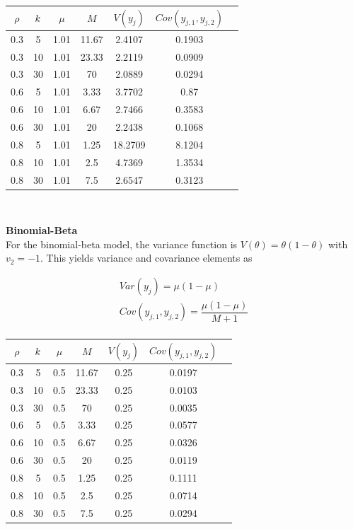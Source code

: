 \documentclass[12pt,epsfig]{article}
\newcommand{\changed}[1]{\textcolor{black}{#1}}
\newcommand{\testlength}{\changed{k}}%
\begin{document}
\begin{centering}
\begin{tabular}{| c |  c | c | c  || c | c | c |} \hline
 $\rho$ & $\testlength$ & $\mu$ & $M$ & $V(y_j)$ & $Cov(y_{j,1}, y_{j,2})$ \\ \hline
 0.3 & 5 & 1.01 & 11.67 & 2.4107 & 0.1903 \\ 
 0.3 & 10 & 1.01 & 23.33 & 2.2119 & 0.0909 \\
 0.3 & 30 & 1.01 & 70 & 2.0889 & 0.0294 \\   
 0.6 & 5 & 1.01 & 3.33 & 3.7702 & 0.87 \\    
 0.6 & 10 & 1.01 & 6.67 & 2.7466 & 0.3583 \\ 
 0.6 & 30 & 1.01 & 20 & 2.2438 & 0.1068 \\   
 0.8 & 5 & 1.01 & 1.25 & 18.2709 & 8.1204 \\ 
 0.8 & 10 & 1.01 & 2.5 & 4.7369 & 1.3534 \\  
 0.8 & 30 & 1.01 & 7.5 & 2.6547 & 0.3123 \\   \hline
    \end{tabular}\\
\end{centering}
\vspace{0.25in}


\noindent \textbf{Binomial-Beta}\\

\noindent For the binomial-beta model, the variance function is $V(\theta) = \theta (1 - \theta)$ with $v_2 = -1$. This yields variance and covariance elements as

\begin{gather*}
Var(y_j) = \mu(1-\mu)\\
Cov(y_{j,1}, y_{j,2}) = \dfrac{\mu(1-\mu)}{M + 1}\\
\end{gather*}

\begin{centering}
\begin{tabular}{| c |  c | c | c  || c | c | c |} \hline
 $\rho$ & $\testlength$ & $\mu$ & $M$ & $V(y_j)$ & $Cov(y_{j,1}, y_{j,2})$ \\ \hline
 0.3 & 5 & 0.5 & 11.67 & 0.25 & 0.0197 \\ 
 0.3 & 10 & 0.5 & 23.33 & 0.25 & 0.0103 \\
 0.3 & 30 & 0.5 & 70 & 0.25 & 0.0035 \\   
 0.6 & 5 & 0.5 & 3.33 & 0.25 & 0.0577 \\  
 0.6 & 10 & 0.5 & 6.67 & 0.25 & 0.0326 \\ 
 0.6 & 30 & 0.5 & 20 & 0.25 & 0.0119 \\   
 0.8 & 5 & 0.5 & 1.25 & 0.25 & 0.1111 \\  
 0.8 & 10 & 0.5 & 2.5 & 0.25 & 0.0714 \\  
 0.8 & 30 & 0.5 & 7.5 & 0.25 & 0.0294 \\  \hline
\end{tabular}\\
\end{centering}

\vspace{0.25in}
\end{document}
